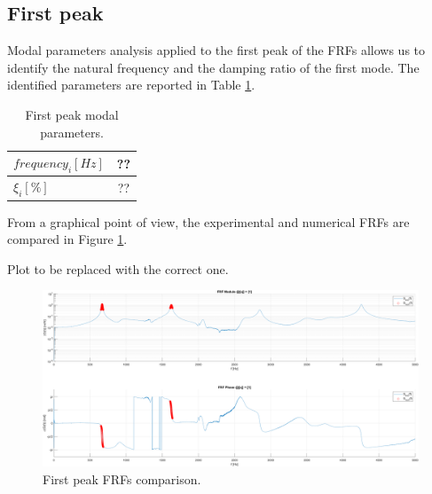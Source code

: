 \subsection{First peak}
\label{subsec:first_peak}

Modal parameters analysis applied to the first peak of the FRFs allows us to identify the natural frequency and the damping ratio of the first mode.
The identified parameters are reported in Table \ref{tab:first_peak}.

\begin{table}[H]
    \centering
    \begin{tabular}{lc}
        \hline
        $frequency_i [Hz]$ & ?? \\
        \hline
        $\xi_i [\%]$       & ?? \\
        \hline
    \end{tabular}
    \caption{First peak modal parameters.}
    \label{tab:first_peak}
\end{table}

From a graphical point of view, the experimental and numerical FRFs are compared in Figure \ref{fig:first_peak}.

\begin{center}
    \huge{Plot to be replaced with the correct one.}
\end{center}

\begin{figure}[H]
    \centering
    \includegraphics[width=\textwidth]{img/MATLAB/Part_B/Comparison_FRF_1.png}
    \caption{First peak FRFs comparison.}
    \label{fig:first_peak}
\end{figure}


